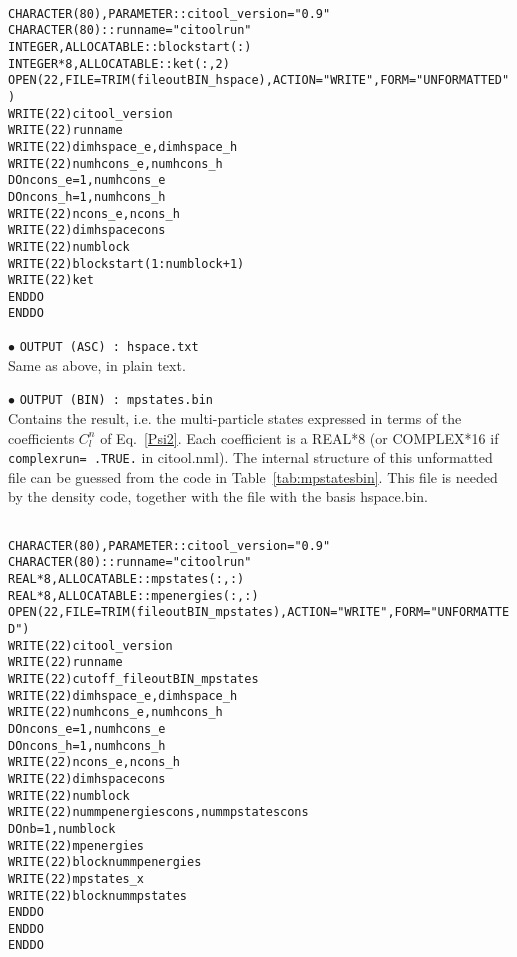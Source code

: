 \documentclass[12pt,twoside]{article}
\newcommand*{\CItool}[0]{{$\cal CI$}\textsf{tool} }
\begin{document}
\begin{table}
\begin{alltt}
\ \\
CHARACTER(80), PARAMETER :: citool_version= "0.9"
CHARACTER(80) :: runname = "citoolrun"
INTEGER, ALLOCATABLE :: blockstart(:)
INTEGER*8, ALLOCATABLE :: ket(:,2)
OPEN(22, FILE=TRIM(fileoutBIN_hspace), ACTION="WRITE", FORM="UNFORMATTED")
WRITE(22) citool_version
WRITE(22) runname
WRITE(22) dimhspace_e, dimhspace_h
WRITE(22) numhcons_e, numhcons_h
DO ncons_e= 1, numhcons_e
DO ncons_h= 1, numhcons_h
  WRITE(22) ncons_e, ncons_h
  WRITE(22) dimhspacecons
  WRITE(22) numblock
  WRITE(22) blockstart(1:numblock+1)
  WRITE(22) ket
END DO
END DO
\end{alltt}
\caption{Scrap of \CItool code for writing the unformatted Hilbert
space file \textsf{hspace.bin}.}
\label{tab:hspacebin}
\end{table}

$\bullet$ \verb#OUTPUT (ASC) : hspace.txt#
\\
Same as above, in plain text.

$\bullet$ \verb#OUTPUT (BIN) : mpstates.bin#
\\
Contains the result, i.e. the multi-particle states expressed in terms
of the coefficients $C^n_l$ of Eq.~\ref{Psi2}.  Each coefficient is a
REAL*8 (or COMPLEX*16 if \verb#complexrun= .TRUE.# in
\textsf{citool.nml}). The internal structure of this
unformatted file can be guessed from the code in
Table~\ref{tab:mpstatesbin}.  This file is needed by the density code,
together with the file with the basis \textsf{hspace.bin}.

\begin{table}
\begin{alltt}
\ \\
CHARACTER(80), PARAMETER :: citool_version= "0.9"
CHARACTER(80) :: runname = "citoolrun"
REAL*8, ALLOCATABLE :: mpstates(:,:)
REAL*8, ALLOCATABLE :: mpenergies(:,:)
OPEN(22, FILE=TRIM(fileoutBIN_mpstates), ACTION="WRITE", FORM="UNFORMATTED")
WRITE(22) citool_version
WRITE(22) runname
WRITE(22) cutoff_fileoutBIN_mpstates
WRITE(22) dimhspace_e, dimhspace_h
WRITE(22) numhcons_e, numhcons_h
DO ncons_e= 1, numhcons_e
DO ncons_h= 1, numhcons_h
  WRITE(22) ncons_e, ncons_h
  WRITE(22) dimhspacecons
  WRITE(22) numblock
  WRITE(22) nummpenergiescons, nummpstatescons
  DO nb= 1, numblock
    WRITE(22) mpenergies
    WRITE(22) blocknummpenergies
    WRITE(22) mpstates_x
    WRITE(22) blocknummpstates
  END DO
END DO
END DO
\end{alltt}
\caption{Scrap of \CItool code for writing the unformatted 
file \textsf{mpstates.bin}, with the computed multi-particle states.}
\label{tab:mpstatesbin}
\end{table}
\end{document}
